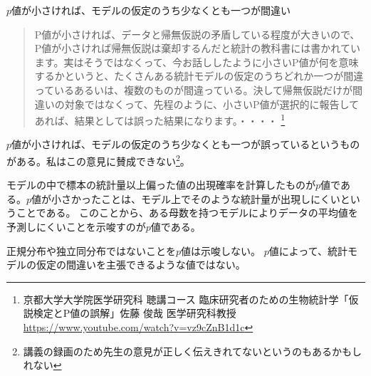 



\begin{SMbox}{$p$値が小さければ、モデルの仮定のうち少なくとも一つが間違い}
    \ 
    \begin{quote}
        P値が小さければ、データと帰無仮説の矛盾している程度が大きいので、P値が小さければ帰無仮説は棄却するんだと統計の教科書には書かれています。実はそうではなくって、今お話ししたように小さいP値が何を意味するかというと、たくさんある統計モデルの仮定のうちどれか一つが間違っているあるいは、複数のものが間違っている。決して帰無仮説だけが間違いの対象ではなくって、先程のように、小さいP値が選択的に報告してあれば、結果としては誤った結果になります。・・・・
        \footnote{京都大学大学院医学研究科 聴講コース 臨床研究者のための生物統計学「仮説検定とP値の誤解」佐藤 俊哉 医学研究科教授 \url{https://www.youtube.com/watch?v=vz9cZnB1d1c} }
    \end{quote}
    $p$値が小さければ、モデルの仮定のうち少なくとも一つが誤っているというものがある。私はこの意見に賛成できない\footnote{講義の録画のため先生の意見が正しく伝えきれてないというのもあるかもしれない}。

    モデルの中で標本の統計量以上偏った値の出現確率を計算したものが$p$値である。$p$値が小さかったことは、モデル上でそのような統計量が出現しにくいということである。
    このことから、ある母数を持つモデルによりデータの平均値を予測しにくいことを示唆すのが$p$値である。

    正規分布や独立同分布ではないことを$p$値は示唆しない。
 $p$値によって、統計モデルの仮定の間違いを主張できるような値ではない。

\end{SMbox}


